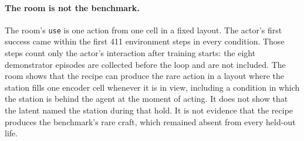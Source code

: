 \paragraph{The room is not the benchmark.}
The room's \texttt{use} is one action from one cell in a fixed layout. The actor's first success came within the first 411 environment steps in every condition. Those steps count only the actor's interaction after training starts: the eight demonstrator episodes are collected before the loop and are not included.
The room shows that the recipe can produce the rare action in a layout where the station fills one encoder cell whenever it is in view, including a condition in which the station is behind the agent at the moment of acting. It does not show that the latent named the station during that hold.
It is not evidence that the recipe produces the benchmark's rare craft, which remained absent from every held-out life.
